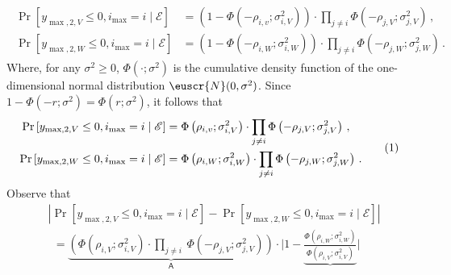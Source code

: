 \documentclass[11pt,letterpaper]{article}
\theoremstyle{plain}
\theoremstyle{definition}
\theoremstyle{remark}
\newcommand{\yesnum}{\addtocounter{equation}{1}\tag{\theequation}}
\def\abs#1{\left| #1 \right|}
\def\biggabs#1{\bigg| #1 \bigg|}
\newcommand{\sinparen}[1]{\ensuremath{(#1)}}
\newcommand{\inparen}[1]{\ensuremath{\left(#1\right)}}
\newcommand{\insquare}[1]{\ensuremath{\left[#1\right]}}
\newcommand{\evE}{\ensuremath{\mathscr{E}}}
\newcommand{\customcal}[1]{\euscr{#1}}
\newcommand{\cN}{\customcal{N}}
\newcommand{\customcdf}[2]{\Phi\sinparen{#1; \sigma_{#2}^2}}
\newcommand{\smax}{\max,2} %
\newcommand{\imax}{i_{\max}}
\begin{document}
{{    \begin{align*}
        \begin{split}
        \Pr\insquare{y_{\smax, V} \leq 0, \imax=i\mid \evE}
            &= \inparen{
                1-\Phi\inparen{-\rho_{i,v}; \sigma_{i,V}^2}
              }\cdot 
              \prod_{j \neq i}
                \Phi\inparen{-\rho_{j,V}; \sigma_{j,V}^2}
            \,,
        \\
        \Pr\insquare{y_{\smax, W} \leq 0, \imax=i\mid \evE} 
            &= \inparen{
                    1-\Phi\inparen{-\rho_{i,W}; \sigma_{i,W}^2}
                  }\cdot 
                  \prod_{j \neq i}
                    \Phi\inparen{-\rho_{j,W}; \sigma_{j,W}^2}
        \,. 
        \end{split} 
    \end{align*}
    Where, for any $\sigma^2\geq 0$, $\customcdf{\cdot}{}$ is the cumulative density function of the one-dimensional normal distribution $\cN(0,\sigma^2)$.
    Since $1-\customcdf{-r}{}=\customcdf{r}{}$, it follows that 
    \begin{align*}
        \begin{split}
        \Pr\insquare{y_{\smax, V} \leq 0, \imax=i\mid \evE}
            &= {
                \Phi\inparen{\rho_{i,v}; \sigma_{i,V}^2}
              }\cdot 
              \prod_{j \neq i}
                \Phi\inparen{-\rho_{j,V}; \sigma_{j,V}^2}
            \,,
        \\
        \Pr\insquare{y_{\smax, W} \leq 0, \imax=i\mid \evE} 
            &= {
                    \Phi\inparen{\rho_{i,W}; \sigma_{i,W}^2}
                  }\cdot 
                  \prod_{j \neq i}
                    \Phi\inparen{-\rho_{j,W}; \sigma_{j,W}^2}
        \,. 
        \end{split}
        \yesnum\label{eq:2ndPrice:probabilityExpressions}
    \end{align*}
    Observe that
    \begin{align*}
        &\abs{ 
            \Pr\insquare{y_{\smax, V} \leq 0,\imax=i\mid \evE}
            - \Pr\insquare{y_{\smax, W} \leq 0,\imax=i\mid \evE} 
        }\\
        &~~= 
        \underbrace{\inparen{
            {
                \customcdf{\rho_{i,V}}{i,V}
            }\cdot \prod_{j\neq i}~ \customcdf{-\rho_{j,V}}{j,V}
        }}_{\textsf{A}}
        \cdot  
        \biggabs{
            1 - 
            \underbrace{\frac{
                \customcdf{\rho_{i,W}}{i,W}
            }{
                \customcdf{\rho_{i,V}}{i,V}
}}}
\end{align*}}}
\end{document}

